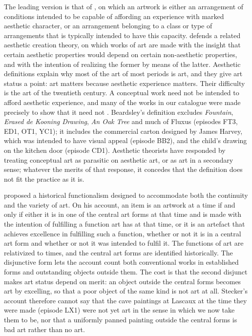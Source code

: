 \documentclass{situationist-preprint}
\begin{document}
The leading version is that of \citet{Beardsley1983}, on which an artwork is either an arrangement of conditions intended to be capable of affording an experience with marked aesthetic character, or an arrangement belonging to a class or type of arrangements that is typically intended to have this capacity. \citet{Zangwill2007} defends a related aesthetic creation theory, on which works of art are made with the insight that certain aesthetic properties would depend on certain non-aesthetic properties, and with the intention of realizing the former by means of the latter. Aesthetic definitions explain why most of the art of most periods is art, and they give art status a point: art matters because aesthetic experience matters. Their difficulty is the art of the twentieth century. A conceptual work need not be intended to afford aesthetic experience, and many of the works in our catalogue were made precisely to show that it need not \citep{Binkley1977}. Beardsley's definition excludes \emph{Fountain}, \emph{Erased de Kooning Drawing}, \emph{An Oak Tree} and much of Fluxus (episodes FT3, ED1, OT1, YC1); it includes the commercial carton designed by James Harvey, which was intended to have visual appeal (episode BB2), and the child's drawing on the kitchen door (episode CD1). Aesthetic theorists have responded by treating conceptual art as parasitic on aesthetic art, or as art in a secondary sense; whatever the merits of that response, it concedes that the definition does not fit the practice as it is.

\citet{Stecker1997} proposed a historical functionalism designed to accommodate both the continuity and the variety of art. On his account, an item is an artwork at a time if and only if either it is in one of the central art forms at that time and is made with the intention of fulfilling a function art has at that time, or it is an artefact that achieves excellence in fulfilling such a function, whether or not it is in a central art form and whether or not it was intended to fulfil it. The functions of art are relativized to times, and the central art forms are identified historically. The disjunctive form lets the account count both conventional works in established forms and outstanding objects outside them. The cost is that the second disjunct makes art status depend on merit: an object outside the central forms becomes art by excelling, so that a poor object of the same kind is not art at all. Stecker's account therefore cannot say that the cave paintings at Lascaux at the time they were made (episode LX1) were not yet art in the sense in which we now take them to be, nor that a uniformly panned painting outside the central forms is bad art rather than no art.
\end{document}
